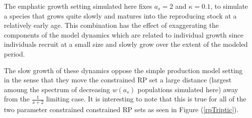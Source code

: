 %
The emphatic growth setting simulated here fixes $a_s=2$ and $\kappa=0.1$, to
simulate a species that grows quite slowly and matures into the reproducing  
stock at a relatively early age. This combination has the effect of 
exaggerating the components of the model dynamics which are related to
individual growth since individuals recruit at a small size and slowly
grow over the extent of the modeled period.

%
The slow growth of these dynamics oppose the simple production model setting
in the sense that they move the constrained RP set a large distance (largest
amoung the spectrum of decreasing $w(a_s)$ populations simulated here)
away from the $\frac{1}{x+2}$ limiting case. It is interesting to note that
this is true for all of the two parameter constrained constrained RP sets as
seen in Figure (\ref{rpTriptic}).


